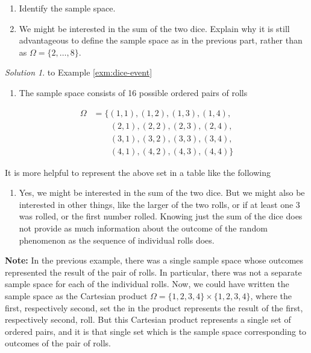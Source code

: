 \documentclass[
]{book}
\providecommand{\tightlist}{%
  \setlength{\itemsep}{0pt}\setlength{\parskip}{0pt}}
\theoremstyle{definition}
\theoremstyle{definition}
\theoremstyle{definition}
\theoremstyle{remark}
\newtheorem*{solution}{Solution}
\begin{document}
\begin{enumerate}
\def\labelenumi{\arabic{enumi}.}
\tightlist
\item
  Identify the sample space.
\item
  We might be interested in the sum of the two dice. Explain why it is still advantageous to define the sample space as in the previous part, rather than as \(\Omega=\{2, \ldots, 8\}\).
\end{enumerate}

\begin{solution}
{}to Example \ref{exm:dice-event}
\end{solution}

\begin{enumerate}
\def\labelenumi{\arabic{enumi}.}
\tightlist
\item
  The sample space consists of 16 possible ordered pairs of rolls
\end{enumerate}

\begin{align*}
\Omega & = \{(1, 1), (1, 2), (1, 3), (1, 4),\\
& \qquad (2, 1), (2, 2), (2, 3), (2, 4),\\
& \qquad (3, 1), (3, 2), (3, 3), (3, 4),\\
& \qquad (4, 1), (4, 2), (4, 3), (4, 4)\}
\end{align*}

It is more helpful to represent the above set in a table like the following

\begin{enumerate}
\def\labelenumi{\arabic{enumi}.}
\tightlist
\item
  Yes, we might be interested in the sum of the two dice. But we might also be interested in other things, like the larger of the two rolls, or if at least one 3 was rolled, or the first number rolled. Knowing just the sum of the dice does not provide as much information about the outcome of the random phenomenon as the sequence of individual rolls does.
\end{enumerate}

\textbf{Note:} In the previous example, there was a single sample space whose outcomes represented the result of the pair of rolls. In particular, there was not a separate sample space for each of the individual rolls. Now, we could have written the sample space as the Cartesian product \(\Omega = \{1, 2, 3, 4\} \times\{1, 2, 3, 4\}\), where the first, respectively second, set the in the product represents the result of the first, respectively second, roll. But this Cartesian product represents a single set of ordered pairs, and it is that single set which is the sample space corresponding to outcomes of the pair of rolls.
\end{document}
